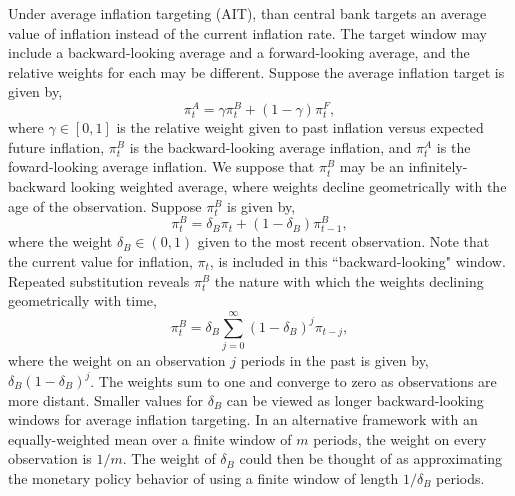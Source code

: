 \documentclass[english,authoryear,12pt]{elsarticle}
\begin{document}
Under average inflation targeting (AIT), than central bank targets an average value of inflation instead of the current inflation rate. The target window may include a backward-looking average and a forward-looking average, and the relative weights for each may be different. Suppose the average inflation target is given by,
\begin{equation}
	\pi_t^A = \gamma \pi_t^B + (1-\gamma) \pi_t^F,
\end{equation}
where $\gamma \in [0,1]$ is the relative weight given to past inflation versus expected future inflation, $\pi_t^B$ is the backward-looking average inflation, and $\pi_t^A$ is the foward-looking average inflation. We suppose that $\pi_t^B$ may be an infinitely-backward looking weighted average, where weights decline geometrically with the age of the observation. Suppose $\pi_t^B$ is given by,
\begin{equation}\label{eq:backward}
	\pi_t^B = \delta_B \pi_t + (1-\delta_B) \pi_{t-1}^B,
\end{equation}
where the weight $\delta_B \in (0,1)$ given to the most recent observation. Note that the current value for inflation, $\pi_t$, is included in this ``backward-looking" window.  Repeated substitution reveals $\pi_t^B$ the nature with which the weights declining geometrically with time,
\begin{equation}\label{eq:backward_all}
	\pi_t^B = \delta_B \sum_{j=0}^{\infty} (1-\delta_B)^j \pi_{t-j},
\end{equation}
where the weight on an observation $j$ periods in the past is given by, $\delta_B (1-\delta_B)^j$. The weights sum to one and converge to zero as observations are more distant. Smaller values for $\delta_B$ can be viewed as longer backward-looking windows for average inflation targeting. In an alternative framework with an equally-weighted mean over a finite window of $m$ periods, the weight on every observation is $1/m$. The weight of $\delta_B$ could then be thought of as approximating the monetary policy behavior of using a finite window of length $1 / \delta_B$ periods.
\end{document}
